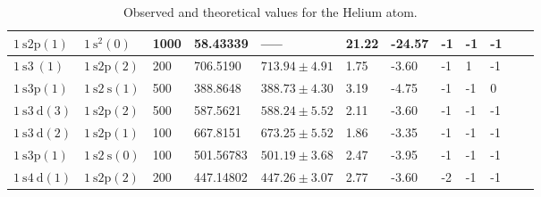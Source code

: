 \begin{table}
\begin{adjustwidth}{-1cm}{-1cm}
\begin{adjustbox}{width=1.75\textwidth, center}
\begin{tabular}{|l|l|l|l|l|l|l|l|l|l|l|l|}
                \hline $1 \mathrm{~s} 2 \mathrm{p}(1)$                      & $1 \mathrm{~s}^2(0)$             & 1000               & 58.43339                                  & -----                            & 21.22                         & -24.57                        & -1                 & -1                 & -1 \\
                \hline \cellcolor{blue!25} $1 \mathrm{~s} 3 \mathrm{~}(1)$  & $1 \mathrm{~s} 2 \mathrm{p}(2)$  & 200                & 706.5190                                  & $713.94 \pm 4.91$                & 1.75                          & -3.60                         & -1                 & 1                  & -1 \\
                \hline \cellcolor{blue!25}  $1 \mathrm{~s} 3 \mathrm{p}(1)$ & $1 \mathrm{~s} 2 \mathrm{~s}(1)$ & 500                & 388.8648                                  & $388.73 \pm 4.30$                & 3.19                          & -4.75                         & -1                 & -1                 & 0  \\
                \hline \cellcolor{blue!25} $1 \mathrm{~s} 3 \mathrm{~d}(3)$ & $1 \mathrm{~s} 2 \mathrm{p}(2)$  & 500                & 587.5621                                  & $588.24 \pm 5.52$                & 2.11                          & -3.60                         & -1                 & -1                 & -1 \\
                \hline \cellcolor{blue!25} $1 \mathrm{~s} 3 \mathrm{~d}(2)$ & $1 \mathrm{~s} 2 \mathrm{p}(1)$  & 100                & 667.8151                                  & $673.25 \pm 5.52$                & 1.86                          & -3.35                         & -1                 & -1                 & -1 \\
                \hline \cellcolor{blue!25} $1 \mathrm{~s} 3 \mathrm{p}(1)$  & $1 \mathrm{~s} 2 \mathrm{~s}(0)$ & 100                & 501.56783                                 & $501.19 \pm 3.68$                & 2.47                          & -3.95                         & -1                 & -1                 & -1 \\
                \hline $1 \mathrm{~s} 4 \mathrm{~d}(1)$                     & $1 \mathrm{~s} 2 \mathrm{p}(2)$  & 200                & 447.14802                                 & $447.26 \pm 3.07$                & 2.77                          & -3.60                         & -2                 & -1                 & -1 \\
                \hline
            \end{tabular}

        \end{adjustbox}

    \end{adjustwidth}
    \caption{Observed and theoretical values for the Helium atom.}
    \label{tab:heliumSpectra}
\end{table}

